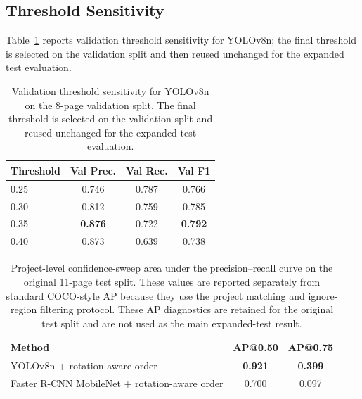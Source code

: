 \documentclass[pdflatex,sn-mathphys-num]{sn-jnl}
\begin{document}
\subsection{Threshold Sensitivity}
Table~\ref{tab:threshold} reports validation threshold sensitivity for YOLOv8n; the final threshold is selected on the validation split and then reused unchanged for the expanded test evaluation.
\begin{table}[t]
\centering
\scriptsize\setlength{\tabcolsep}{3pt}
\caption{Validation threshold sensitivity for YOLOv8n on the 8-page validation split. The final threshold is selected on the validation split and reused unchanged for the expanded test evaluation.}
\label{tab:threshold}
\begin{tabular}{lccc}
\toprule
Threshold & Val Prec. & Val Rec. & Val F1 \\
\midrule
0.25 & 0.746 & 0.787 & 0.766 \\
0.30 & 0.812 & 0.759 & 0.785 \\
0.35 & \textbf{0.876} & 0.722 & \textbf{0.792} \\
0.40 & 0.873 & 0.639 & 0.738 \\
\bottomrule
\end{tabular}
\end{table}


\begin{table}[t]
\centering
\scriptsize\setlength{\tabcolsep}{3pt}
\caption{Project-level confidence-sweep area under the precision--recall curve on the original 11-page test split. These values are reported separately from standard COCO-style AP because they use the project matching and ignore-region filtering protocol. These AP diagnostics are retained for the original test split and are not used as the main expanded-test result.}
\label{tab:project_ap}
\begin{tabular}{lcc}
\toprule
Method & AP@0.50 & AP@0.75 \\
\midrule
YOLOv8n + rotation-aware order & \textbf{0.921} & \textbf{0.399} \\
Faster R-CNN MobileNet + rotation-aware order & 0.700 & 0.097 \\
\bottomrule
\end{tabular}
\end{table}
\end{document}
